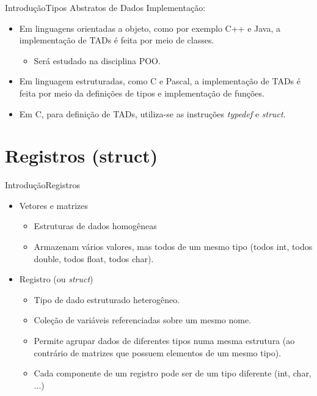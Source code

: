\documentclass[aspectratio=169]{beamer}
\begin{document}

\begin{frame}{Introdução}{Tipos Abstratos de Dados}
Implementação:
\begin{itemize}
\item Em linguagens orientadas a objeto, como por exemplo C++ e Java, a implementação de TADs é feita por meio de classes. 
\begin{itemize}
\item Será estudado na disciplina POO.
\end{itemize}
\item Em linguagem estruturadas, como C e Pascal, a implementação de TADs é feita por meio da definições de tipos e implementação de funções.
\item Em C, para definição de TADs, utiliza-se as instruções {\it typedef} e {\it struct}.
\end{itemize}
\end{frame}

\section{Registros (struct)} 

\begin{frame}{Introdução}{Registros}
\begin{itemize}
\item Vetores e matrizes 
\begin{itemize}
\item Estruturas de dados homogêneas 
\item Armazenam vários valores, mas todos de um mesmo tipo (todos int, todos double, todos float, todos char).
\end{itemize}
\item Registro (ou {\it struct})
\begin{itemize}
\item Tipo de dado estruturado heterogêneo.
\item Coleção de variáveis referenciadas sobre um mesmo nome.
\item Permite agrupar dados de diferentes tipos numa mesma estrutura (ao contrário de matrizes que possuem elementos de um mesmo tipo).
\item Cada componente de um registro pode ser de um tipo diferente (int, char, ...)
\end{itemize}
\end{itemize}
\end{frame}
\end{document}
